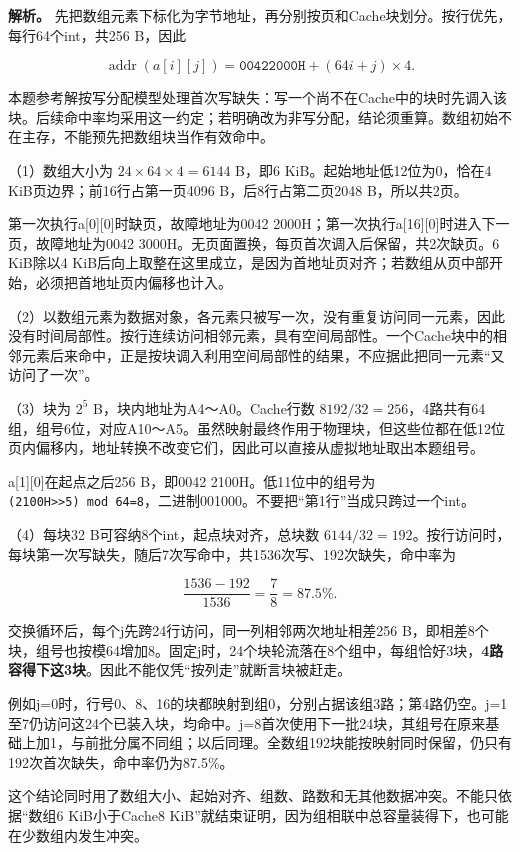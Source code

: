 
\textbf{解析。} 先把数组元素下标化为字节地址，再分别按页和Cache块划分。按行优先，每行64个int，共256 B，因此

\[
\operatorname{addr}(a[i][j])=\mathtt{00422000H}+(64i+j)\times4.
\]

本题参考解按写分配模型处理首次写缺失：写一个尚不在Cache中的块时先调入该块。后续命中率均采用这一约定；若明确改为非写分配，结论须重算。数组初始不在主存，不能预先把数组块当作有效命中。

（1）数组大小为 \(24\times64\times4=6144\) B，即6 KiB。起始地址低12位为0，恰在4 KiB页边界；前16行占第一页4096 B，后8行占第二页2048 B，所以共2页。

第一次执行a{[}0{]}{[}0{]}时缺页，故障地址为0042 2000H；第一次执行a{[}16{]}{[}0{]}时进入下一页，故障地址为0042 3000H。无页面置换，每页首次调入后保留，共2次缺页。6 KiB除以4 KiB后向上取整在这里成立，是因为首地址页对齐；若数组从页中部开始，必须把首地址页内偏移也计入。

（2）以数组元素为数据对象，各元素只被写一次，没有重复访问同一元素，因此没有时间局部性。按行连续访问相邻元素，具有空间局部性。一个Cache块中的相邻元素后来命中，正是按块调入利用空间局部性的结果，不应据此把同一元素``又访问了一次''。

（3）块为 \(2^5\) B，块内地址为A4～A0。Cache行数 \(8192/32=256\)，4路共有64组，组号6位，对应A10～A5。虽然映射最终作用于物理块，但这些位都在低12位页内偏移内，地址转换不改变它们，因此可以直接从虚拟地址取出本题组号。

a{[}1{]}{[}0{]}在起点之后256 B，即0042 2100H。低11位中的组号为 \texttt{(2100H\textgreater{}\textgreater{}5)\ mod\ 64=8}，二进制001000。不要把``第1行''当成只跨过一个int。

（4）每块32 B可容纳8个int，起点块对齐，总块数 \(6144/32=192\)。按行访问时，每块第一次写缺失，随后7次写命中，共1536次写、192次缺失，命中率为

\[
\frac{1536-192}{1536}=\frac78=87.5\%.
\]

交换循环后，每个j先跨24行访问，同一列相邻两次地址相差256 B，即相差8个块，组号也按模64增加8。固定j时，24个块轮流落在8个组中，每组恰好3块，\textbf{4路容得下这3块}。因此不能仅凭``按列走''就断言块被赶走。

例如j=0时，行号0、8、16的块都映射到组0，分别占据该组3路；第4路仍空。j=1至7仍访问这24个已装入块，均命中。j=8首次使用下一批24块，其组号在原来基础上加1，与前批分属不同组；以后同理。全数组192块能按映射同时保留，仍只有192次首次缺失，命中率仍为87.5\%。

这个结论同时用了数组大小、起始对齐、组数、路数和无其他数据冲突。不能只依据``数组6 KiB小于Cache8 KiB''就结束证明，因为组相联中总容量装得下，也可能在少数组内发生冲突。

